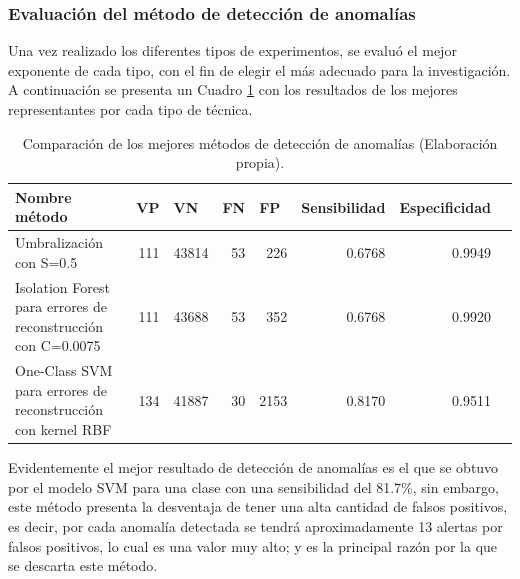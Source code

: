 \subsubsection{Evaluaci\'{o}n del m\'{e}todo de detecci\'{o}n de anomal\'{i}as}

Una vez realizado los diferentes tipos de experimentos, se evalu\'{o} el mejor exponente de cada tipo, con el fin de elegir el m\'{a}s adecuado para la investigaci\'{o}n. A continuaci\'{o}n se presenta un Cuadro \ref{table:evaluacion_metodo_anomalias} con los resultados de los mejores representantes por cada tipo de t\'{e}cnica.

\begin{table}[H]
\centering
\begin{center}
\begin{tabular}{|p{40mm}|r|r|r|r|r|r|r|}
\hline
\textbf{Nombre m\'{e}todo} & \multicolumn{1}{l|}{\textbf{VP}} & \multicolumn{1}{l|}{\textbf{VN}}& \multicolumn{1}{l|}{\textbf{FN}}& \multicolumn{1}{l|}{\textbf{FP}} & \multicolumn{1}{l|}{\textbf{Sensibilidad}} & \multicolumn{1}{l|}{\textbf{Especificidad}} \\ \hline
Umbralizaci\'{o}n con S=0.5 & \cellcolor[HTML]{AADD99} 111 & \cellcolor[HTML]{AADD99} 43814 & \cellcolor[HTML]{FFCE93} 53 & \cellcolor[HTML]{FFCE93} 226 & 0.6768 & 0.9949 \\ \hline
Isolation Forest para errores de reconstrucci\'{o}n con C=0.0075 & \cellcolor[HTML]{AADD99} 111 & \cellcolor[HTML]{AADD99} 43688 & \cellcolor[HTML]{FFCE93} 53 & \cellcolor[HTML]{FFCE93} 352 & 0.6768 & 0.9920 \\ \hline
One-Class SVM para errores de reconstrucci\'{o}n con kernel RBF& \cellcolor[HTML]{AADD99} 134 & \cellcolor[HTML]{AADD99} 41887 & \cellcolor[HTML]{FFCE93} 30 & \cellcolor[HTML]{FFCE93} 2153 & 0.8170 & 0.9511 \\ \hline
\end{tabular}
\end{center}
\caption{Comparaci\'{o}n de los mejores m\'{e}todos de detecci\'{o}n de anomal\'{i}as (Elaboraci\'{o}n propia).}

\label{table:evaluacion_metodo_anomalias}
\end{table}

Evidentemente el mejor resultado de detecci\'{o}n de anomal\'{i}as es el que se obtuvo por el modelo SVM para una clase con una sensibilidad del 81.7\%, sin embargo, este m\'{e}todo presenta la desventaja de tener una alta cantidad de falsos positivos, es decir, por cada anomal\'{i}a detectada se tendr\'{a} aproximadamente 13 alertas por falsos positivos, lo cual es una valor muy alto; y es la principal raz\'{o}n por la que se descarta este m\'{e}todo.

